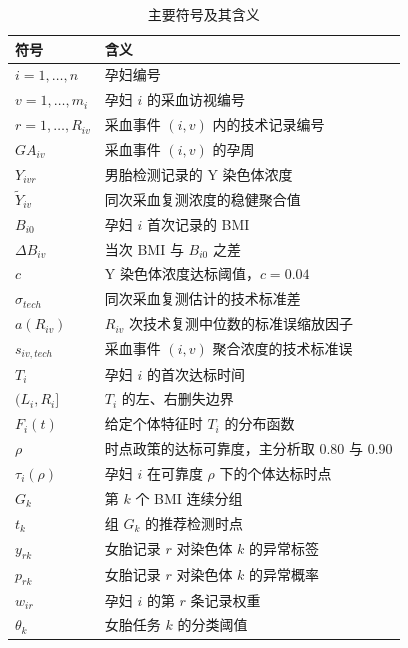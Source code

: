 \documentclass[UTF8,fontset=fandol,zihao=-4,a4paper]{ctexart}
\renewcommand{\arraystretch}{1.18}
\begin{document}
\begin{table}[!htbp]
  \centering
  \caption{主要符号及其含义}
  \label{tab:symbols}
  \scriptsize
  \setlength{\tabcolsep}{5pt}
  \renewcommand{\arraystretch}{1.05}
  \begin{tabularx}{\textwidth}{@{}Q{3.3cm}X@{}}
    \toprule
    符号 & 含义 \\
    \midrule
    \(i=1,\ldots,n\) & 孕妇编号 \\
    \(v=1,\ldots,m_i\) & 孕妇 \(i\) 的采血访视编号 \\
    \(r=1,\ldots,R_{iv}\) & 采血事件 \((i,v)\) 内的技术记录编号 \\
    \(GA_{iv}\) & 采血事件 \((i,v)\) 的孕周 \\
    \(Y_{ivr}\) & 男胎检测记录的 Y 染色体浓度 \\
    \(\widetilde Y_{iv}\) & 同次采血复测浓度的稳健聚合值 \\
    \(B_{i0}\) & 孕妇 \(i\) 首次记录的 BMI \\
    \(\Delta B_{iv}\) & 当次 BMI 与 \(B_{i0}\) 之差 \\
    \(c\) & Y 染色体浓度达标阈值，\(c=0.04\) \\
    \(\sigma_{tech}\) & 同次采血复测估计的技术标准差 \\
    \(a(R_{iv})\) & \(R_{iv}\) 次技术复测中位数的标准误缩放因子 \\
    \(s_{iv,tech}\) & 采血事件 \((i,v)\) 聚合浓度的技术标准误 \\
    \(T_i\) & 孕妇 \(i\) 的首次达标时间 \\
    \((L_i,R_i]\) & \(T_i\) 的左、右删失边界 \\
    \(F_i(t)\) & 给定个体特征时 \(T_i\) 的分布函数 \\
    \(\rho\) & 时点政策的达标可靠度，主分析取 0.80 与 0.90 \\
    \(\tau_i(\rho)\) & 孕妇 \(i\) 在可靠度 \(\rho\) 下的个体达标时点 \\
    \(G_k\) & 第 \(k\) 个 BMI 连续分组 \\
    \(t_k\) & 组 \(G_k\) 的推荐检测时点 \\
    \(y_{rk}\) & 女胎记录 \(r\) 对染色体 \(k\) 的异常标签 \\
    \(p_{rk}\) & 女胎记录 \(r\) 对染色体 \(k\) 的异常概率 \\
    \(w_{ir}\) & 孕妇 \(i\) 的第 \(r\) 条记录权重 \\
    \(\theta_k\) & 女胎任务 \(k\) 的分类阈值 \\
    \bottomrule
  \end{tabularx}
\end{table}
\end{document}
